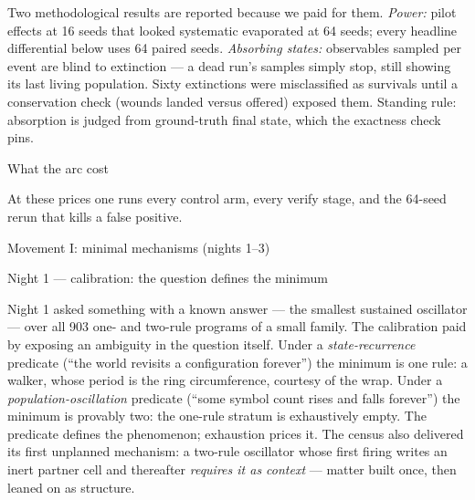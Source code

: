 Two methodological results are reported because we paid for them.
{\it Power:} pilot effects at 16 seeds that looked systematic
evaporated at 64 seeds; every headline differential below uses 64
paired seeds. {\it Absorbing states:} observables sampled per event
are blind to extinction --- a dead run's samples simply stop, still
showing its last living population. Sixty extinctions were
misclassified as survivals until a conservation check (wounds
landed versus offered) exposed them. Standing rule: absorption is
judged from ground-truth final state, which the exactness check
pins.

\secc What the arc cost

\medskip
\noindent{}
\medskip

\noindent At these prices one runs every control arm, every verify
stage, and the 64-seed rerun that kills a false positive.

\sec Movement I: minimal mechanisms (nights 1--3)

\secc Night 1 --- calibration: the question defines the minimum

Night 1 asked something with a known answer --- the smallest
sustained oscillator --- over all 903 one- and two-rule programs of
a small family. The calibration paid by exposing an ambiguity in
the question itself. Under a {\it state-recurrence} predicate
(“the world revisits a configuration forever”) the minimum is one
rule: a walker, whose period is the ring circumference, courtesy of
the wrap. Under a {\it population-oscillation} predicate (“some
symbol count rises and falls forever”) the minimum is provably
two: the one-rule stratum is exhaustively empty. The predicate
defines the phenomenon; exhaustion prices it. The census also
delivered its first unplanned mechanism: a two-rule oscillator
whose first firing writes an inert partner cell and thereafter
{\it requires it as context} --- matter built once, then leaned on
as structure.

